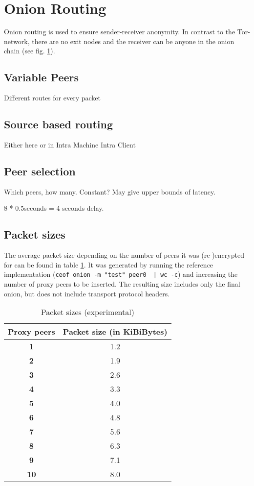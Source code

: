 \section{Onion Routing}
\label{onionrouting}
Onion routing is used to ensure sender-receiver anonymity. In contrast
to the Tor-network, there are no exit nodes and the receiver can be anyone
in the onion chain (see fig. \ref{onionrouting}).

\subsection{Variable Peers}
Different routes for every packet

\subsection{Source based routing}
Either here or in Intra Machine Intra Client
\subsection{Peer selection}
Which peers, how many. Constant? May give upper bounds of latency.

8 * 0.5seconds = 4 seconds delay.


\subsection{Packet sizes}
The average packet size depending on the number of peers it was
(re-)encrypted for can be found in table \ref{pkgsizes}.
It was generated by running the reference implementation
(\verb=ceof onion -m "test" peer0  | wc -c=)
and increasing the number of proxy peers to be inserted.
The resulting size includes only the final onion,
but does not include transport protocol headers.
\begin{longtable}{|c|c|}
\caption{Packet sizes (experimental)}
\label{pkgsizes}\\
\hline
\textbf{Proxy peers} & \textbf{Packet size (in KiBiBytes)}\\
\hline
\textbf{1} & 1.2\\
\hline
\textbf{2} & 1.9\\
\hline
\textbf{3} & 2.6\\
\hline
\textbf{4} & 3.3\\
\hline
\textbf{5} & 4.0\\
\hline
\textbf{6} & 4.8\\
\hline
\textbf{7} & 5.6\\
\hline
\textbf{8} & 6.3\\
\hline
\textbf{9} & 7.1\\
\hline
\textbf{10} & 8.0\\
\hline
\end{longtable}



